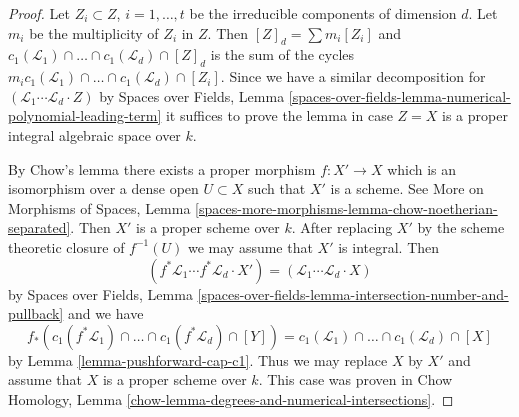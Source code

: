 \documentclass{stacks-project}
\theoremstyle{plain}
\theoremstyle{definition}
\theoremstyle{remark}
\numberwithin{equation}{subsection}
\begin{document}
\begin{proof}
Let $Z_i \subset Z$, $i = 1, \ldots, t$ be the irreducible components
of dimension $d$. Let $m_i$ be the multiplicity of $Z_i$ in $Z$. Then
$[Z]_d = \sum m_i[Z_i]$ and
$c_1(\mathcal{L}_1) \cap \ldots \cap c_1(\mathcal{L}_d) \cap [Z]_d$
is the sum of the cycles
$m_i c_1(\mathcal{L}_1) \cap \ldots \cap c_1(\mathcal{L}_d) \cap [Z_i]$.
Since we have a similar decomposition for
$(\mathcal{L}_1 \cdots \mathcal{L}_d \cdot Z)$ by
Spaces over Fields, Lemma
\ref{spaces-over-fields-lemma-numerical-polynomial-leading-term}
it suffices to prove the lemma in case $Z = X$
is a proper integral algebraic space over $k$.

\medskip\noindent
By Chow's lemma there exists a proper morphism $f : X' \to X$
which is an isomorphism over a dense open $U \subset X$
such that $X'$ is a scheme. See More on Morphisms of Spaces, Lemma
\ref{spaces-more-morphisms-lemma-chow-noetherian-separated}.
Then $X'$ is a proper scheme over $k$. After replacing $X'$
by the scheme theoretic closure of $f^{-1}(U)$
we may assume that $X'$ is integral. Then
$$
(f^*\mathcal{L}_1 \cdots f^*\mathcal{L}_d \cdot X') =
(\mathcal{L}_1 \cdots \mathcal{L}_d \cdot X)
$$
by Spaces over Fields, Lemma
\ref{spaces-over-fields-lemma-intersection-number-and-pullback}
and we have
$$
f_*(c_1(f^*\mathcal{L}_1) \cap \ldots \cap c_1(f^*\mathcal{L}_d) \cap [Y]) =
c_1(\mathcal{L}_1) \cap \ldots \cap c_1(\mathcal{L}_d) \cap [X]
$$
by Lemma \ref{lemma-pushforward-cap-c1}. Thus we may replace $X$ by $X'$
and assume that $X$ is a proper scheme over $k$. This case
was proven in Chow Homology, Lemma
\ref{chow-lemma-degrees-and-numerical-intersections}.
\end{proof}



















\end{document}
